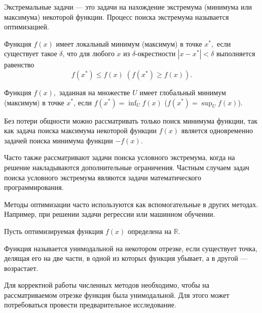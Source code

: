 

\Theory


Экстремальные задачи — это задачи на нахождение экстремума (минимума
или максимума) некоторой функции. Процесс поиска экстремума называется
оптимизацией.
\begin{defn}
Функция $f(x)$ имеет локальный минимум (максимум) в точке $x^{*},$
если существует такое $\delta$, что для любого $x$ из $\delta$-окрестности
$|x-x^{*}|<\delta$ выполняется равенство 
\[
f(x^{*})\leqslant f(x)\;(f(x^{*})\geqslant f(x)).
\]

\end{defn}

\begin{defn}
Функция $f(x),$ заданная на множестве $U$ имеет глобальный минимум
(максимум) в точке $x^{*}$, если $f(x^{*})=\inf_{U}f(x)$ ($f(x^{*})=\sup_{U}f(x)$).
\end{defn}
Без потери общности можно рассматривать только поиск минимума функции,
так как задача поиска максимума некоторой функции $f(x)$ является
одновременно задачей поиска минимума функции $-f(x).$

Часто также рассматривают задачи поиска условного экстремума, когда
на решение накладываются дополнительные ограничения. Частным случаем
задач поиска условного экстремума являются задачи математического
программирования.

Методы оптимизации часто используются как вспомогательные в других
методах. Например, при решении задачи регрессии или машинном обучении. 

Пусть оптимизируемая функция $f(x)$ определена на $\mathbb{R}$.
\begin{defn}
Функция называется унимодальной на некотором отрезке, если существует
точка, делящая его на две части, в одной из которых функция убывает,
а в другой — возрастает.
\end{defn}
Для корректной работы численных методов необходимо, чтобы на рассматриваемом
отрезке функция была унимодальной. Для этого может потребоваться провести
предварительное исследование.


